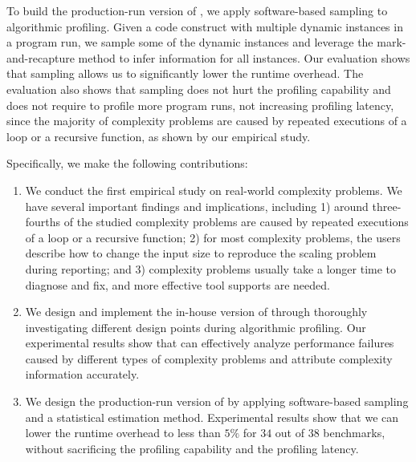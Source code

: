 To build the production-run version of \Tool,
we apply software-based sampling to algorithmic profiling.
Given a code construct with multiple dynamic instances in a program run,
we sample some of the dynamic instances and leverage the mark-and-recapture
method\citep{mark-recapture} to infer information for all instances.
Our evaluation shows that
sampling allows us to significantly lower the runtime overhead.
The evaluation also shows that sampling does not hurt the profiling capability
and does not require to profile more program runs,
not increasing profiling latency, since
the majority of complexity problems are caused by
repeated executions of a loop or a recursive function, as shown by our empirical study.



Specifically, we make the following contributions:

\begin{enumerate}

\item We conduct the first empirical study on real-world complexity problems.
We have several important findings and implications, including
1) around three-fourths of the studied complexity problems are
caused by repeated executions of a loop or a recursive function;
2) for most complexity problems,
the users describe how to change the input size to reproduce the scaling problem during reporting;
and 3) complexity problems usually take a longer time to diagnose and fix,
and more effective tool supports are needed.

\item We design and implement the in-house version of \Tool through
thoroughly investigating different design points during algorithmic profiling.
Our experimental results show that \Tool can effectively analyze performance failures
caused by different types of complexity problems and attribute complexity information accurately.

\item We design the production-run version of \Tool by applying
software-based sampling and a statistical estimation method.
Experimental results show that we can lower the runtime overhead to less than
$5\%$ for $34$ out of $38$ benchmarks,
without sacrificing the profiling capability and the profiling latency.

\end{enumerate}
